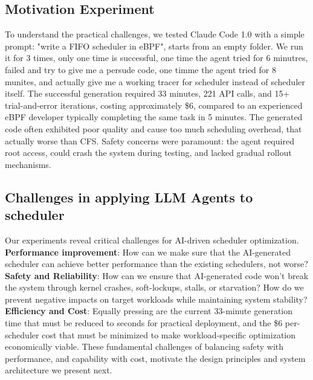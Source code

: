 \subsection{Motivation Experiment}

To understand the practical challenges, we tested Claude Code 1.0\cite{claudecode} with a simple prompt: "write a FIFO scheduler in eBPF", starts from an empty folder. We run it for 3 times, only one time is successful, one time the agent tried for 6 minutres, failed and try to give me a persude code, one timme the agent tried for 8 munites, and actually give me a working tracer for scheduler instead of scheduler itself. The successful generation required 33 minutes, 221 API calls, and 15+ trial-and-error iterations, costing approximately \$6, compared to an experienced eBPF developer typically completing the same task in 5 minutes. The generated code often exhibited poor quality and cause too much scheduling overhead, that actually worse than CFS. Safety concerns were paramount: the agent required root access, could crash the system during testing, and lacked gradual rollout mechanisms.

\subsection{Challenges in applying LLM Agents to scheduler}

Our experiments reveal critical challenges for AI-driven scheduler optimization. \textbf{Performance improvement}: How can we make sure that the AI-generated scheduler can achieve better performance than the existing schedulers, not worse? \textbf{Safety and Reliability}: How can we ensure that AI-generated code won't break the system through kernel crashes, soft-lockups, stalls, or starvation? How do we prevent negative impacts on target workloads while maintaining system stability? \textbf{Efficiency and Cost}: Equally pressing are the current 33-minute generation time that must be reduced to seconds for practical deployment, and the \$6 per-scheduler cost that must be minimized to make workload-specific optimization economically viable. These fundamental challenges of balancing safety with performance, and capability with cost, motivate the design principles and system architecture we present next.